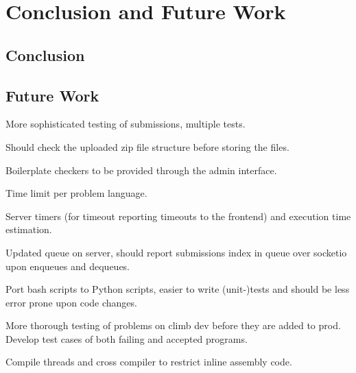 \chapter{Conclusion and Future Work}

\section{Conclusion}

\section{Future Work}
\label{sec:future-work}

More sophisticated testing of submissions, multiple tests.

Should check the uploaded zip file structure before storing the files.

Boilerplate checkers to be provided through the admin interface.

Time limit per problem language.

Server timers (for timeout reporting timeouts to the frontend) and execution time estimation.

Updated queue on server, should report submissions index in queue over socketio upon enqueues and dequeues.

Port bash scripts to Python scripts, easier to write (unit-)tests and should be less error prone upon code changes.

More thorough testing of problems on climb dev before they are added to prod. Develop test cases of both failing and accepted programs.

Compile threads and cross compiler to restrict inline assembly code.

